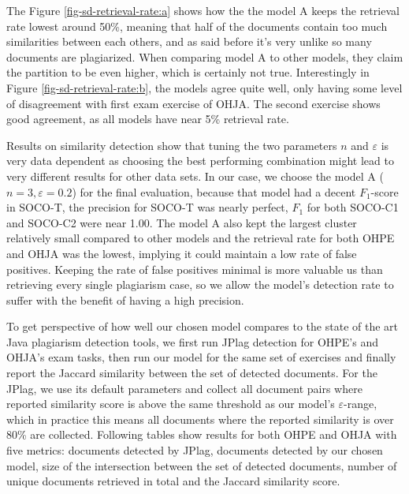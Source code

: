 \noindent
The Figure \ref{fig-sd-retrieval-rate:a} shows how the the model A keeps the retrieval rate lowest around 50\%, meaning that half of the documents contain too much similarities between each others, and as said before it's very unlike so many documents are plagiarized. When comparing model A to other models, they claim the partition to be even higher, which is certainly not true. Interestingly in Figure \ref{fig-sd-retrieval-rate:b}, the models agree quite well, only having some level of disagreement with first exam exercise of OHJA. The second exercise shows good agreement, as all models have near 5\% retrieval rate.

Results on similarity detection show that tuning the two parameters $n$ and $\varepsilon$ is very data dependent as choosing the best performing combination might lead to very different results for other data sets. In our case, we choose the model A ($n=3, \varepsilon=0.2$) for the final evaluation, because that model had a decent $F_1$-score in SOCO-T, the precision for SOCO-T was nearly perfect, $F_1$ for both SOCO-C1 and SOCO-C2 were near 1.00. The model A also kept the largest cluster relatively small compared to other models and the retrieval rate for both OHPE and OHJA was the lowest, implying it could maintain a low rate of false positives. Keeping the rate of false positives minimal is more valuable us than retrieving every single plagiarism case, so we allow the model's detection rate to suffer with the benefit of having a high precision.  

To get perspective of how well our chosen model compares to the state of the art Java plagiarism detection tools, we first run JPlag detection for OHPE's and OHJA's exam tasks, then run our model for the same set of exercises and finally report the Jaccard similarity between the set of detected documents. For the JPlag, we use its default parameters and collect all document pairs where reported similarity score is above the same threshold as our model's $\varepsilon$-range, which in practice this means all documents where the reported similarity is over 80\% are collected. Following tables show results for both OHPE and OHJA with five metrics: documents detected by JPlag, documents detected by our chosen model, size of the intersection between the set of detected documents, number of unique documents retrieved in total and the Jaccard similarity score.

